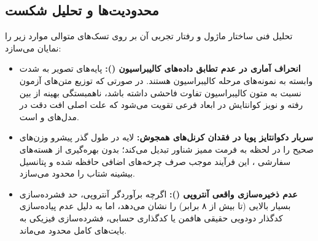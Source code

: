 \subsection{محدودیت‌ها و تحلیل شکست}
تحلیل فنی ساختار ماژول و رفتار تجربی آن بر روی تسک‌های متوالی موارد زیر را نمایان می‌سازد:
\begin{itemize}
    \item \textbf{انحراف آماری در عدم تطابق داده‌های کالیبراسیون ():} پایه‌های تصویر  به شدت وابسته به نمونه‌های مرحله کالیبراسیون هستند. در صورتی که توزیع متن‌های آزمون نسبت به متون کالیبراسیون تفاوت فاحشی داشته باشد، ناهمبستگی بهینه از بین رفته و نویز کوانتایش در ابعاد فرعی تقویت می‌شود که علت اصلی افت دقت در مدل‌های  و  است.
    \item \textbf{سربار دکوانتایز پویا در فقدان کرنل‌های همجوش:} لایه  در طول گذر پیشرو وزن‌های صحیح را در لحظه به فرمت ممیز شناور تبدیل می‌کند؛ بدون بهره‌گیری از هسته‌های سفارشی ، این فرآیند موجب صرف چرخه‌های اضافی حافظه شده و پتانسیل بیشینه شتاب را محدود می‌سازد.
    \item \textbf{عدم ذخیره‌سازی واقعی آنتروپی ():} اگرچه برآوردگر آنتروپی، حد فشرده‌سازی بسیار بالایی (تا بیش از ۸ برابر) را نشان می‌دهد، اما به دلیل عدم پیاده‌سازی کدگذار دودویی حقیقی هافمن یا کدگذاری حسابی، فشرده‌سازی فیزیکی به بایت‌های کامل محدود می‌ماند.
\end{itemize}
